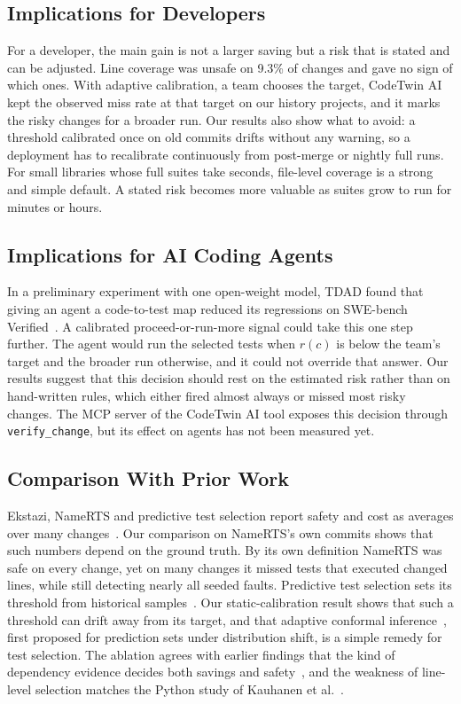 \documentclass[conference]{IEEEtran}
\begin{document}
\subsection{Implications for Developers}
For a developer, the main gain is not a larger saving but a risk that is stated and can be adjusted. Line coverage was unsafe on 9.3\% of changes and gave no sign of which ones. With adaptive calibration, a team chooses the target, CodeTwin AI kept the observed miss rate at that target on our history projects, and it marks the risky changes for a broader run. Our results also show what to avoid: a threshold calibrated once on old commits drifts without any warning, so a deployment has to recalibrate continuously from post-merge or nightly full runs. For small libraries whose full suites take seconds, file-level coverage is a strong and simple default. A stated risk becomes more valuable as suites grow to run for minutes or hours.

\subsection{Implications for AI Coding Agents}
In a preliminary experiment with one open-weight model, TDAD found that giving an agent a code-to-test map reduced its regressions on SWE-bench Verified~\cite{alonso2026tdad}. A calibrated proceed-or-run-more signal could take this one step further. The agent would run the selected tests when $r(c)$ is below the team's target and the broader run otherwise, and it could not override that answer. Our results suggest that this decision should rest on the estimated risk rather than on hand-written rules, which either fired almost always or missed most risky changes. The MCP server of the CodeTwin AI tool exposes this decision through \texttt{verify\_change}, but its effect on agents has not been measured yet.

\subsection{Comparison With Prior Work}
Ekstazi, NameRTS and predictive test selection report safety and cost as averages over many changes~\cite{gligoric2015ekstazi,wang2026namerts,machalica2019pts}. Our comparison on NameRTS's own commits shows that such numbers depend on the ground truth. By its own definition NameRTS was safe on every change, yet on many changes it missed tests that executed changed lines, while still detecting nearly all seeded faults. Predictive test selection sets its threshold from historical samples~\cite{machalica2019pts}. Our static-calibration result shows that such a threshold can drift away from its target, and that adaptive conformal inference~\cite{gibbs2021aci}, first proposed for prediction sets under distribution shift, is a simple remedy for test selection. The ablation agrees with earlier findings that the kind of dependency evidence decides both savings and safety~\cite{gligoric2015ekstazi,legunsen2016static}, and the weakness of line-level selection matches the Python study of Kauhanen et al.~\cite{kauhanen2021python}.
\end{document}
